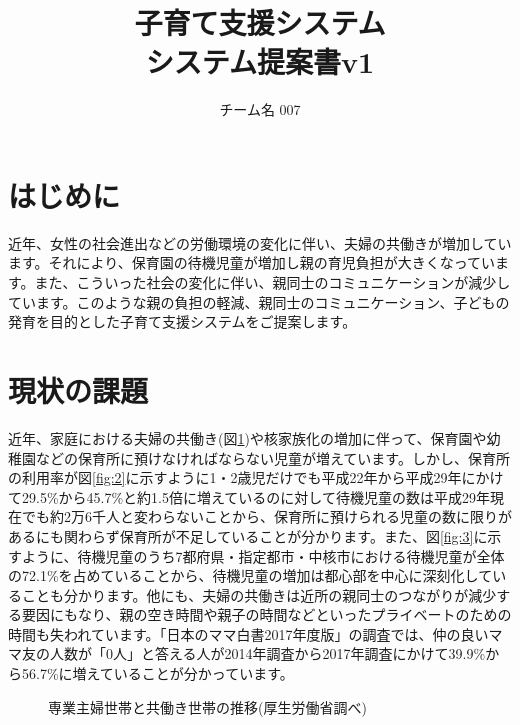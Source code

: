 \documentclass[a4j]{jarticle}
\title{
\vspace{30mm}
{\bf 子育て支援システム}
\\
\vspace{5mm}
{\bf システム提案書v1\\
}
\vspace{120mm}
}
\author{
\vspace{5mm}
チーム名 007\\
\vspace{5mm}
}
\begin{document}
\maketitle
\tableofcontents
\newpage

\section{はじめに}
近年、女性の社会進出などの労働環境の変化に伴い、夫婦の共働きが増加しています。それにより、保育園の待機児童が増加し親の育児負担が大きくなっています。また、こういった社会の変化に伴い、親同士のコミュニケーションが減少しています。このような親の負担の軽減、親同士のコミュニケーション、子どもの発育を目的とした子育て支援システムをご提案します。

\section{現状の課題}
近年、家庭における夫婦の共働き(図\ref{fig:1})\cite{bib:tomo}や核家族化の増加に伴って、保育園や幼稚園などの保育所に預けなければならない児童が増えています。しかし、保育所の利用率が図\ref{fig:2}に示すように1・2歳児だけでも平成22年から平成29年にかけて29.5\%から45.7\%と約1.5倍に増えているのに対して待機児童の数は平成29年現在でも約2万6千人と変わらないことから、保育所に預けられる児童の数に限りがあるにも関わらず保育所が不足していることが分かります\cite{bib:taiki}。また、図\ref{fig:3}に示すように、待機児童のうち7都府県・指定都市・中核市における待機児童が全体の72.1\%を占めていることから、待機児童の増加は都心部を中心に深刻化していることも分かります\cite{bib:taiki}。他にも、夫婦の共働きは近所の親同士のつながりが減少する要因にもなり、親の空き時間や親子の時間などといったプライベートのための時間も失われています。「日本のママ白書2017年度版」\cite{bib:mama}の調査では、仲の良いママ友の人数が「0人」と答える人が2014年調査から2017年調査にかけて39.9\%から56.7\%に増えていることが分かっています。

\begin{figure}[H]
\begin{center}
\caption{専業主婦世帯と共働き世帯の推移(厚生労働省調べ)}
\label{fig:1}
\end{center}
\end{figure}
\end{document}
